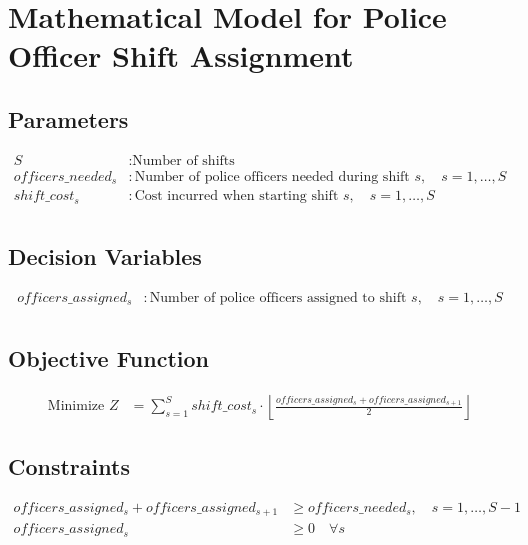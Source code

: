 \documentclass{article}
\begin{document}
\section*{Mathematical Model for Police Officer Shift Assignment}

\subsection*{Parameters}
\begin{align*}
S & : \text{Number of shifts} \\
officers\_needed_{s} & : \text{Number of police officers needed during shift } s, \quad s = 1, \ldots, S \\
shift\_cost_{s} & : \text{Cost incurred when starting shift } s, \quad s = 1, \ldots, S \\
\end{align*}

\subsection*{Decision Variables}
\begin{align*}
officers\_assigned_{s} & : \text{Number of police officers assigned to shift } s, \quad s = 1, \ldots, S \\
\end{align*}

\subsection*{Objective Function}
\begin{align*}
\text{Minimize } Z & = \sum_{s=1}^{S} shift\_cost_{s} \cdot \left\lfloor \frac{officers\_assigned_{s} + officers\_assigned_{s+1}}{2} \right\rfloor 
\end{align*}

\subsection*{Constraints}
\begin{align*}
officers\_assigned_{s} + officers\_assigned_{s+1} & \geq officers\_needed_{s}, \quad s = 1, \ldots, S-1 \\
officers\_assigned_{s} & \geq 0 \quad \forall s \\
\end{align*}
\end{document}
